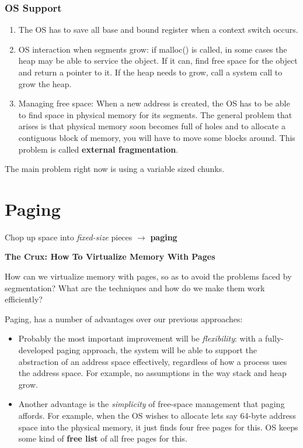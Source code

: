 \subsubsection{OS Support}

\begin{enumerate}
    \item The OS has to save all base and bound register when a context
        switch occurs.
    \item OS interaction when segments grow: if malloc() is called, in some
        cases the heap may be able to service the object. If it can, find
        free space for the object and return a pointer to it. If the heap
        needs to grow, call a system call to grow the heap.
    \item Managing free space: When a new address is created, the OS has to be
        able to find space in physical memory for its segments. The general
        problem that arises is that physical memory soon becomes full of holes 
        and to allocate a contiguous block of memory, you will have to move some
        blocks around. This problem is called \textbf{external fragmentation}.
\end{enumerate}

The main problem right now is using a variable sized chunks.

\section{Paging}

Chop up space into \textit{fixed-size} pieces $\rightarrow$ \textbf{paging}\\

\begin{tcolorbox}
    \textbf{The Crux: How To Virtualize Memory With Pages}

    How can we virtualize memory with pages, so as to avoid the problems 
    faced by segmentation? What are the techniques and how do we make them work
    efficiently?
\end{tcolorbox}

Paging, has a number of advantages over our previous approaches:

\begin{itemize}
    \item Probably the most important improvement will be \textit{flexibility}:
        with a fully-developed paging approach, the system will be able to 
        support the abstraction of an address space effectively, regardless
        of how a process uses the address space. For example, no assumptions
        in the way stack and heap grow.
    \item Another advantage is the \textit{simplicity} of free-space management
        that paging affords. For example, when the OS wishes to allocate lets
        say 64-byte address space into the physical memory, it just finds
        four free pages for this. OS keeps some kind of \textbf{free list}
        of all free pages for this.
\end{itemize}

